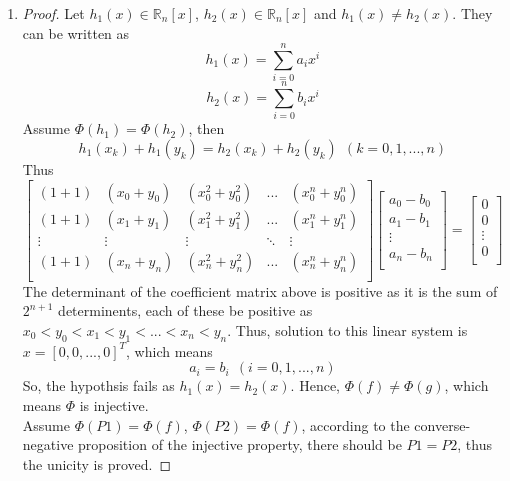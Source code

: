 \documentclass[paper=a4, fontsize=11pt]{scrartcl} %
\numberwithin{equation}{section} %
\numberwithin{figure}{section} %
\numberwithin{table}{section} %
\begin{document}
\begin{enumerate}
	\item 
		\begin{proof}
			Let $h_1(x) \in \mathbb{R}_n [x]$, $h_2(x) \in \mathbb{R}_n [x]$ and  $h_1(x) \neq h_2(x)$. They can be written as
			\begin{equation}
				h_1(x) = \sum_{i=0}^{n} a_i x^i
			\end{equation}
			\begin{equation}
				h_2(x) = \sum_{i=0}^{n} b_i x^i
			\end{equation}
			Assume $\Phi(h_1) = \Phi(h_2)$, then
			\begin{equation}
				h_1(x_k) + h_1(y_k) = h_2(x_k) + h_2(y_k) \ \ (k=0, 1, ... , n)
			\end{equation}
			Thus
			\begin{equation}
				 \begin{bmatrix}
					(1+1) & (x_0 + y_0) &  (x_0^2 + y_0^2) & ... & (x_0^n + y_0^n)\\
					(1+1) & (x_1 + y_1)  &  (x_1^2 + y_1^2) & ... & (x_1^n  + y_1^n)\\
					\vdots  & \vdots    & \vdots & \ddots & \vdots \\
					(1+1) & (x_n + y_n) & (x_n^2 + y_n^2) & ... & (x_n^n + y_n^n)\\
				\end{bmatrix}
				\begin{bmatrix}
					a_0 - b_0\\
					a_1 - b_1\\
					\vdots \\
					a_n - b_n\\
				\end{bmatrix}
				=
				\begin{bmatrix}
					0\\
					0\\
					\vdots \\
					0\\
				\end{bmatrix}
			\end{equation}
			The determinant of the coefficient matrix above is positive as it is the sum of $2^{n+1}$ determinents, each of these be positive as $x_0 < y_0 < x_1 < y_1 < ... < x_n < y_n$. Thus, solution to this linear system is $x = [0, 0, ... , 0]^T$, which means
			\begin{equation}
				a_i = b_i \ \ (i=0, 1, ... , n)
			\end{equation}
			So, the hypothsis fails as $h_1(x) = h_2(x)$. Hence, $\Phi(f) \neq \Phi(g)$, which means $\Phi$ is injective.\\
			Assume $\Phi(P1) = \Phi(f)$, $\Phi(P2) = \Phi(f)$, according to the converse-negative proposition of the injective property, there should be $P1 = P2$, thus the unicity is proved.
		\end{proof}
	

\end{enumerate}
\end{document}
